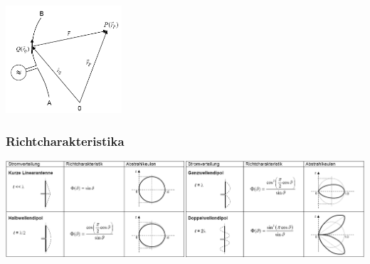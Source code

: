 		\begin{minipage}{4.5cm}
			\includegraphics[height=4cm]{./images/LinAnt_Strahlung.png}
        \end{minipage}
		
	\subsubsection{Richtcharakteristika}
	\begin{center}
		\includegraphics[width=19cm]{./images/LinAnt_Richtcharakteristika.png}    
  \end{center}

